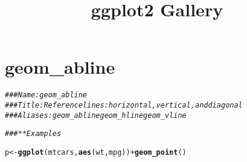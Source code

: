 \documentclass[a4paper,titlepage]{tufte-handout}\usepackage[]{graphicx}\usepackage[]{xcolor}
\title{ggplot2 Gallery}
\makeatletter
\newcommand{\hlcom}[1]{\textcolor[rgb]{0.678,0.584,0.686}{\textit{#1}}}%
\newcommand{\hlopt}[1]{\textcolor[rgb]{0,0,0}{#1}}%
\newcommand{\hldef}[1]{\textcolor[rgb]{0.345,0.345,0.345}{#1}}%
\newcommand{\hlkwb}[1]{\textcolor[rgb]{0.69,0.353,0.396}{#1}}%
\newcommand{\hlkwd}[1]{\textcolor[rgb]{0.737,0.353,0.396}{\textbf{#1}}}%
\newenvironment{kframe}{%
 \def\at@end@of@kframe{}%
 \ifinner\ifhmode%
  \def\at@end@of@kframe{\end{minipage}}%
  \begin{minipage}{\columnwidth}%
 \fi\fi%
 \def\FrameCommand##1{\hskip\@totalleftmargin \hskip-\fboxsep
 \colorbox{shadecolor}{##1}\hskip-\fboxsep
     \hskip-\linewidth \hskip-\@totalleftmargin \hskip\columnwidth}%
 \MakeFramed {\advance\hsize-\width
   \@totalleftmargin\z@ \linewidth\hsize
   \@setminipage}}%
 {\par\unskip\endMakeFramed%
 \at@end@of@kframe}
\newenvironment{knitrout}{}{} %
\makeatother
\begin{document}
\maketitle
\tableofcontents






\section{geom\_abline}

\begin{knitrout}
\color{fgcolor}\begin{kframe}
\begin{alltt}
\hlcom{### Name: geom_abline}
\hlcom{### Title: Reference lines: horizontal, vertical, and diagonal}
\hlcom{### Aliases: geom_abline geom_hline geom_vline}

\hlcom{### ** Examples}

\hldef{p} \hlkwb{<-} \hlkwd{ggplot}\hldef{(mtcars,} \hlkwd{aes}\hldef{(wt, mpg))} \hlopt{+} \hlkwd{geom_point}\hldef{()}


\end{alltt}
\end{kframe}
\end{knitrout}
\end{document}
